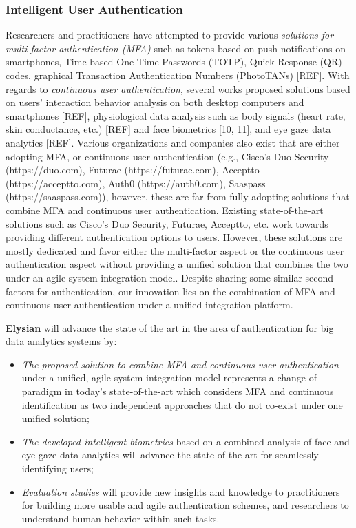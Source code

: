 \documentclass[a4paper,11pt]{article}
\newcommand{\project}[1]{\textbf{#1}\xspace}
\newcommand{\SECURITY}{\project{Elysian}}
\newcommand{\TheProject}{\SECURITY}
\begin{document}
\subsubsection{Intelligent User Authentication}
\label{sect:auth}

Researchers and practitioners have attempted to provide various \textit{solutions for multi-factor authentication (MFA)} such as tokens based on push notifications on smartphones, Time-based One Time Passwords (TOTP), Quick Response (QR) codes, graphical Transaction Authentication Numbers (PhotoTANs) [REF]. With regards to \textit{continuous user authentication}, several works proposed solutions based on users’ interaction behavior analysis on both desktop computers and smartphones [REF], physiological data analysis such as body signals (heart rate, skin conductance, etc.) [REF] and face biometrics [10, 11], and eye gaze data analytics [REF]. Various organizations and companies also exist that are either adopting MFA, or continuous user authentication (e.g., Cisco’s Duo Security (https://duo.com), Futurae (https://futurae.com), Acceptto (https://acceptto.com), Auth0 (https://auth0.com), Saaspass (https://saaspass.com)), however, these are far from fully adopting solutions that combine MFA and continuous user authentication. Existing state-of-the-art solutions such as Cisco’s Duo Security, Futurae, Acceptto, etc. work towards providing different authentication options to users. However, these solutions are mostly dedicated and favor either the multi-factor aspect or the continuous user authentication aspect without providing a unified solution that combines the two under an agile system integration model. Despite sharing some similar second factors for authentication, our innovation lies on the combination of MFA and continuous user authentication under a unified integration platform. 

\begin{mdframed}[backgroundcolor=gray!10]
\TheProject{} will advance the state of the art in the area of authentication for big data analytics systems by:
\begin{itemize}
\item \emph{The proposed solution to combine MFA and continuous user authentication} under a unified, agile system integration model represents a change of paradigm in today’s state-of-the-art which considers MFA and continuous identification as two independent approaches that do not co-exist under one unified solution; 
\item \emph{The developed intelligent biometrics} based on a combined analysis of face and eye gaze data analytics will advance the state-of-the-art for seamlessly identifying users;
\item \emph{Evaluation studies} will provide new insights and knowledge to practitioners for building more usable and agile authentication schemes, and researchers to understand human behavior within such tasks.
\end{itemize}
\end{mdframed}
\end{document}
